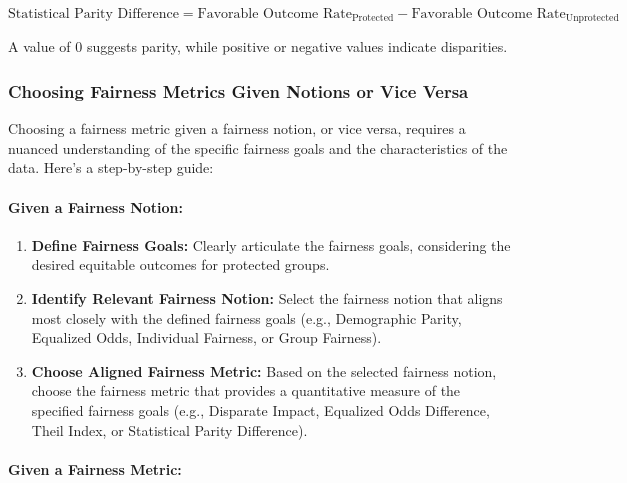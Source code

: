 \[
\text{Statistical Parity Difference} = \text{Favorable Outcome Rate}_{\text{Protected}} - \text{Favorable Outcome Rate}_{\text{Unprotected}}
\]

A value of 0 suggests parity, while positive or negative values indicate disparities.



\subsubsection{Choosing Fairness Metrics Given Notions or Vice Versa}

Choosing a fairness metric given a fairness notion, or vice versa, requires a nuanced understanding of the specific fairness goals and the characteristics of the data. Here's a step-by-step guide:

\paragraph{Given a Fairness Notion:}

\begin{enumerate}
 
    \item \textbf{Define Fairness Goals:} Clearly articulate the fairness goals, considering the desired equitable outcomes for protected groups.
 
    \item \textbf{Identify Relevant Fairness Notion:} Select the fairness notion that aligns most closely with the defined fairness goals (e.g., Demographic Parity, Equalized Odds, Individual Fairness, or Group Fairness).
 
    \item \textbf{Choose Aligned Fairness Metric:} Based on the selected fairness notion, choose the fairness metric that provides a quantitative measure of the specified fairness goals (e.g., Disparate Impact, Equalized Odds Difference, Theil Index, or Statistical Parity Difference).

\end{enumerate}

\paragraph{Given a Fairness Metric:}

